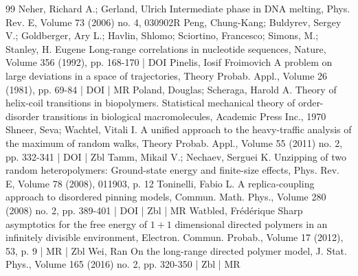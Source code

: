 \begin{thebibliography}{99}
Neher, Richard A.; Gerland, Ulrich Intermediate phase in DNA melting, Phys. Rev. E, Volume 73 (2006) no. 4, 030902R
Peng, Chung-Kang; Buldyrev, Sergey V.; Goldberger, Ary L.; Havlin, Shlomo; Sciortino, Francesco; Simons, M.; Stanley, H. Eugene Long-range correlations in nucleotide sequences, Nature, Volume 356 (1992), pp. 168-170 | DOI
Pinelis, Iosif Froimovich A problem on large deviations in a space of trajectories, Theory Probab. Appl., Volume 26 (1981), pp. 69-84 | DOI | MR
Poland, Douglas; Scheraga, Harold A. Theory of helix-coil transitions in biopolymers. Statistical mechanical theory of order-disorder transitions in biological macromolecules, Academic Press Inc., 1970
Shneer, Seva; Wachtel, Vitali I. A unified approach to the heavy-traffic analysis of the maximum of random walks, Theory Probab. Appl., Volume 55 (2011) no. 2, pp. 332-341 | DOI | Zbl
Tamm, Mikail V.; Nechaev, Serguei K. Unzipping of two random heteropolymers: Ground-state energy and finite-size effects, Phys. Rev. E, Volume 78 (2008), 011903, p. 12
Toninelli, Fabio L. A replica-coupling approach to disordered pinning models, Commun. Math. Phys., Volume 280 (2008) no. 2, pp. 389-401 | DOI | Zbl | MR
Watbled, Frédérique Sharp asymptotics for the free energy of $1+1$ dimensional directed polymers in an infinitely divisible environment, Electron. Commun. Probab., Volume 17 (2012), 53, p. 9 | MR | Zbl
Wei, Ran On the long-range directed polymer model, J. Stat. Phys., Volume 165 (2016) no. 2, pp. 320-350 | Zbl | MR
\end{thebibliography}
